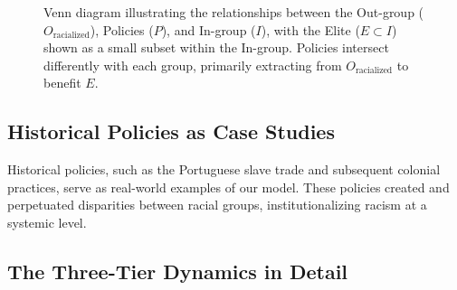 \documentclass[12pt]{article}
\begin{document}
\begin{figure}[htbp]
\centering
{}
\caption{Venn diagram illustrating the relationships between the Out-group ($O_{\text{racialized}}$), Policies ($P$), and In-group ($I$), with the Elite ($E \subset I$) shown as a small subset within the In-group. Policies intersect differently with each group, primarily extracting from $O_{\text{racialized}}$ to benefit $E$.}
\label{fig:venn_model}
\end{figure}

\subsection{Historical Policies as Case Studies}

Historical policies, such as the Portuguese slave trade and subsequent colonial practices, serve as real-world examples of our model. These policies created and perpetuated disparities between racial groups, institutionalizing racism at a systemic level.

\subsection{The Three-Tier Dynamics in Detail}
\end{document}
